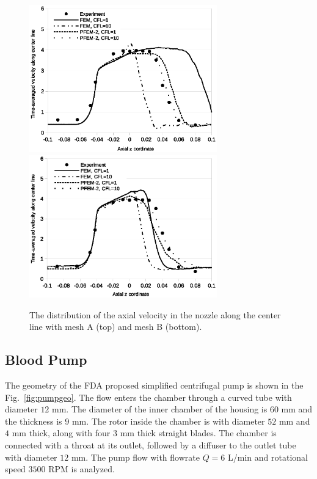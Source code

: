 \begin{figure}[htbp]
    \centering
    \includegraphics[width=3.2in]{imgs/nozzle_pump/nozzle_midvel_fm2.eps}
    \includegraphics[width=3.2in]{imgs/nozzle_pump/nozzle_midvel_pm2.eps}
    \caption{The distribution of the axial velocity in the nozzle along the center line with mesh A (top) and mesh B (bottom).
}
    \label{fig:nozzlemidvel}
\end{figure}

\subsection{Blood Pump}

The geometry of the FDA proposed simplified centrifugal pump is shown in the Fig.~\ref{fig:pumpgeo}. The flow enters the chamber through a curved tube with diameter $12$ mm. The diameter of the inner chamber of the housing is $60$ mm and the thickness is $9$ mm. The rotor inside the chamber is with diameter $52$ mm and $4$ mm thick, along with four $3$ mm thick straight blades. The chamber is connected with a throat at its outlet, followed by a diffuser to the outlet tube with diameter $12$ mm. The pump flow with flowrate $Q=6$ L/min and rotational speed $3500$ RPM is analyzed. 

